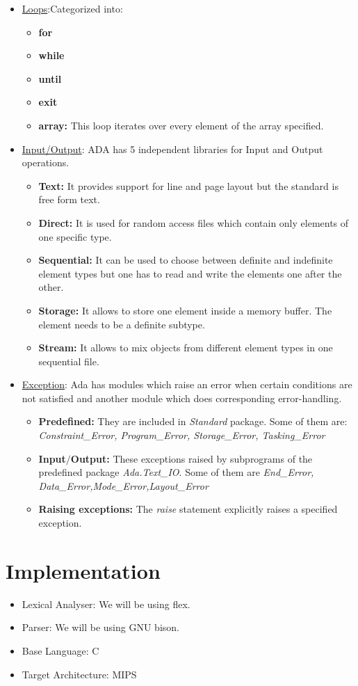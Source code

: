 \documentclass{article}
\begin{document}
\begin{itemize}
\begin{itemize}
		\end{itemize}		
	\item \uline{Loops}:Categorized into:
		\begin{itemize}
			\item \textbf{for}
			\item \textbf{while}
			\item \textbf{until}
			\item \textbf{exit}
			\item \textbf{array:} This loop iterates over every element of the array specified.
		\end{itemize}
	\item \uline{Input/Output}: ADA has 5 independent libraries for Input and Output operations.
	\begin{itemize}
		\item \textbf{Text:} It provides support for line and page layout but the standard is free form text.
		\item \textbf{Direct:} It is used for random access files which contain only elements of one specific type.
		\item \textbf{Sequential:} It can be used to choose between definite and indefinite element types but one has to read and write the elements one after the other.
		\item \textbf{Storage:} It allows to store one element inside a memory buffer. The element needs to be a
definite subtype.
		\item \textbf{Stream:} It allows to mix objects from different element types in one sequential file.
	\end{itemize}	
	\item \uline{Exception}: Ada has modules which raise an error when certain conditions are not satisfied and another module which does corresponding error-handling.
	\begin{itemize}
		\item \textbf{Predefined:} They are included in \emph{Standard} package. Some of them are: \emph{Constraint\_Error, Program\_Error, Storage\_Error, Tasking\_Error}
		\item \textbf{Input$/$Output:} These exceptions raised by subprograms of the predefined package \emph{Ada.Text\_IO}. Some of them are \emph{End\_Error, Data\_Error,Mode\_Error,Layout\_Error}
		\item \textbf{Raising exceptions:} The \emph{raise} statement explicitly raises a specified exception.
	\end{itemize}
\end{itemize}
\section{Implementation}
	\begin{itemize}
		\item Lexical Analyser: We will be using flex. \cite{flex}
		\item Parser: We will be using GNU bison. \cite{bison}
		\item Base Language: C
		\item Target Architecture: MIPS
	\end{itemize}
\printbibliography
\end{document}
